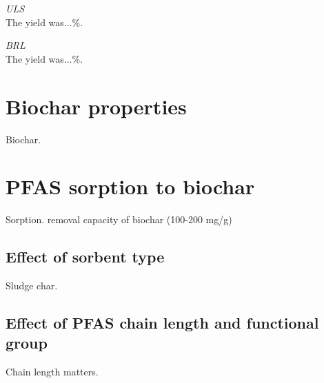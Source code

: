 \textit{ULS}\\
The yield was...\%.

\textit{BRL}\\
The yield was...\%.

\section{Biochar properties}
Biochar. 

\section{PFAS sorption to biochar}
Sorption. removal capacity of biochar (100-200 mg/g) \citep{Luo2021}

\subsection{Effect of sorbent type}
Sludge char.

\subsection{Effect of PFAS chain length and functional group}
Chain length matters. 

